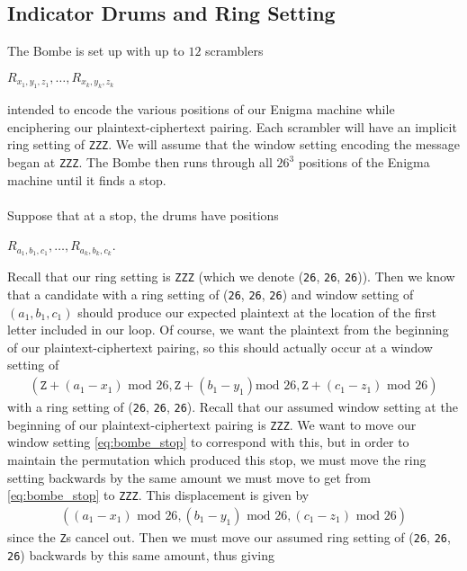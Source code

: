 \subsection{Indicator Drums and Ring Setting}
The Bombe is set up with up to $12$ scramblers
\begin{center}
  $R_{x_1, y_1, z_1},\dots, R_{x_{k}, y_{k}, z_{k}}$
\end{center}
intended to encode the various positions of our Enigma machine while
enciphering our plaintext-ciphertext pairing. Each scrambler will
have an implicit ring setting of \texttt{ZZZ}. We will assume that
the window setting encoding the message began at \texttt{ZZZ}. The Bombe then
runs through all $26^3$ positions of the Enigma machine until it finds
a stop.
\\\\Suppose that at a stop, the drums have positions
\begin{center}
  $R_{a_1, b_1, c_1},\dots, R_{a_{k}, b_k, c_{k}}$.
\end{center}
Recall that our ring setting is \texttt{ZZZ} (which we denote
  (\texttt{26},
\texttt{26}, \texttt{26})). Then we know that a candidate with a ring
setting of (\texttt{26},
\texttt{26}, \texttt{26}) and window setting of $(a_1, b_1, c_1)$
should produce our expected plaintext at the location of the
first letter included in our loop. Of course, we want the plaintext
from the beginning of our plaintext-ciphertext pairing, so this
should actually occur at a window setting of
\begin{align}
  \label{eq:bombe_stop}
  (\texttt{Z} + (a_1-x_1)\text{ mod }26, \texttt{Z} + (b_1-y_1)\text{
  mod }26, \texttt{Z} + (c_1-z_1)\text{ mod }26)
\end{align}
with a ring setting of (\texttt{26},
\texttt{26}, \texttt{26}). Recall that our assumed window setting at
the beginning of our plaintext-ciphertext pairing is \texttt{ZZZ}. We
want to move our window setting \ref{eq:bombe_stop} to correspond
with this, but in order to maintain the permutation which produced this
stop, we must move the ring setting backwards by the same amount we
must move to get from \ref{eq:bombe_stop} to \texttt{ZZZ}. This displacement
is given by
\begin{align*}
  ((a_1-x_1)\text{ mod }26, (b_1-y_1)\text{ mod }26, (c_1-z_1)\text{ mod }26)
\end{align*}
since the \texttt{Z}s cancel out. Then we must move our assumed ring
setting of (\texttt{26},
\texttt{26}, \texttt{26}) backwards by this same amount, thus giving
